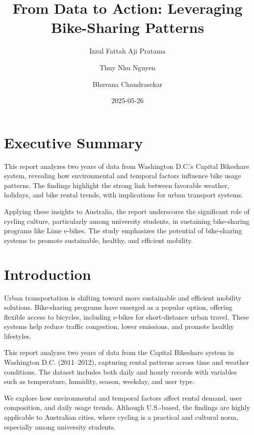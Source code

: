 \documentclass[
  12pt,
]{article}
\title{\textbf{From Data to Action: Leveraging Bike-Sharing Patterns}}
\author{Izzul Fattah Aji Pratama \and Thuy Nhu Nguyen \and Bhuvana
Chandrasekar}
\date{2025-05-26}
\renewcommand*\contentsname{Table of contents}
\newcommand\contentsname{Table of contents}
\begin{document}
\maketitle

\renewcommand*\contentsname{Table of contents}
{
\hypersetup{linkcolor=}
\setcounter{tocdepth}{2}
\tableofcontents
}

\section{Executive Summary}\label{executive-summary}

This report analyzes two years of data from Washington D.C.'s Capital
Bikeshare system, revealing how environmental and temporal factors
influence bike usage patterns. The findings highlight the strong link
between favorable weather, holidays, and bike rental trends, with
implications for urban transport systems.

Applying these insights to Australia, the report underscores the
significant role of cycling culture, particularly among university
students, in sustaining bike-sharing programs like Lime e-bikes. The
study emphasizes the potential of bike-sharing systems to promote
sustainable, healthy, and efficient mobility.

\section{Introduction}\label{introduction}

Urban transportation is shifting toward more sustainable and efficient
mobility solutions. Bike-sharing programs have emerged as a popular
option, offering flexible access to bicycles, including e-bikes for
short-distance urban travel. These systems help reduce traffic
congestion, lower emissions, and promote healthy lifestyles.

This report analyzes two years of data from the Capital Bikeshare system
in Washington D.C. (2011--2012), capturing rental patterns across time
and weather conditions. The dataset includes both daily and hourly
records with variables such as temperature, humidity, season, weekday,
and user type.

We explore how environmental and temporal factors affect rental demand,
user composition, and daily usage trends. Although U.S.-based, the
findings are highly applicable to Australian cities, where cycling is a
practical and cultural norm, especially among university students.
\end{document}
